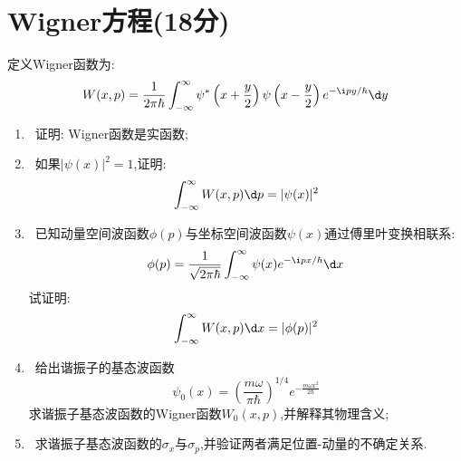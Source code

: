 \documentclass{ctexart}
\begin{document}
\section{Wigner方程(18分)}
定义Wigner函数为:
\[
W(x, p) = \frac{1}{2\pi\hbar} \int_{-\infty}^{\infty} \psi^*\left(x + \frac{y}{2}\right) \psi\left(x - \frac{y}{2}\right) e^{-\i p y / \hbar}\d y
\]
\begin{enumerate}[label=\tbf{\arabic*.}]
    \item {}\ 证明: Wigner函数是实函数;
    \item {}\ 如果$\left|\psi(x)\right|^2=1$,证明:
    \[\int_{-\infty}^{\infty} W(x, p) \d p = |\psi(x)|^2\]
    \item {}\ 已知动量空间波函数$\phi(p)$与坐标空间波函数$\psi(x)$通过傅里叶变换相联系:
    \[\phi(p) = \frac{1}{\sqrt{2\pi\hbar}} \int_{-\infty}^{\infty} \psi(x) e^{-\i p x/\hbar} \d x\]
    试证明:
    \[\int_{-\infty}^{\infty} W(x, p)\d x =|\phi(p)|^2\]
    \item {}\ 给出谐振子的基态波函数
    \[\psi_0(x) = \left( \frac{m\omega}{\pi\hbar} \right)^{1/4} e^{-\frac{m\omega x^2}{2\hbar}}\]
    求谐振子基态波函数的Wigner函数$W_0(x,p)$,并解释其物理含义;
    \item {}\ 求谐振子基态波函数的$\sigma_x$与$\sigma_p$,并验证两者满足位置-动量的不确定关系.
\end{enumerate}
\end{document}
